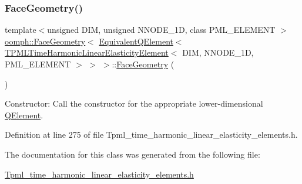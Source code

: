 \subsubsection{\texorpdfstring{Face\+Geometry()}{FaceGeometry()}}
{\footnotesize\ttfamily template$<$unsigned D\+IM, unsigned N\+N\+O\+D\+E\+\_\+1D, class P\+M\+L\+\_\+\+E\+L\+E\+M\+E\+NT $>$ \\
\hyperlink{classoomph_1_1FaceGeometry}{oomph\+::\+Face\+Geometry}$<$ \hyperlink{classoomph_1_1EquivalentQElement}{Equivalent\+Q\+Element}$<$ \hyperlink{classoomph_1_1TPMLTimeHarmonicLinearElasticityElement}{T\+P\+M\+L\+Time\+Harmonic\+Linear\+Elasticity\+Element}$<$ D\+IM, N\+N\+O\+D\+E\+\_\+1D, P\+M\+L\+\_\+\+E\+L\+E\+M\+E\+NT $>$ $>$ $>$\+::\hyperlink{classoomph_1_1FaceGeometry}{Face\+Geometry} (\begin{DoxyParamCaption}{ }\end{DoxyParamCaption})\hspace{0.3cm}{\ttfamily [inline]}}



Constructor\+: Call the constructor for the appropriate lower-\/dimensional \hyperlink{classoomph_1_1QElement}{Q\+Element}. 



Definition at line 275 of file Tpml\+\_\+time\+\_\+harmonic\+\_\+linear\+\_\+elasticity\+\_\+elements.\+h.



The documentation for this class was generated from the following file\+:\begin{DoxyCompactItemize}
\item 
\hyperlink{Tpml__time__harmonic__linear__elasticity__elements_8h}{Tpml\+\_\+time\+\_\+harmonic\+\_\+linear\+\_\+elasticity\+\_\+elements.\+h}\end{DoxyCompactItemize}
